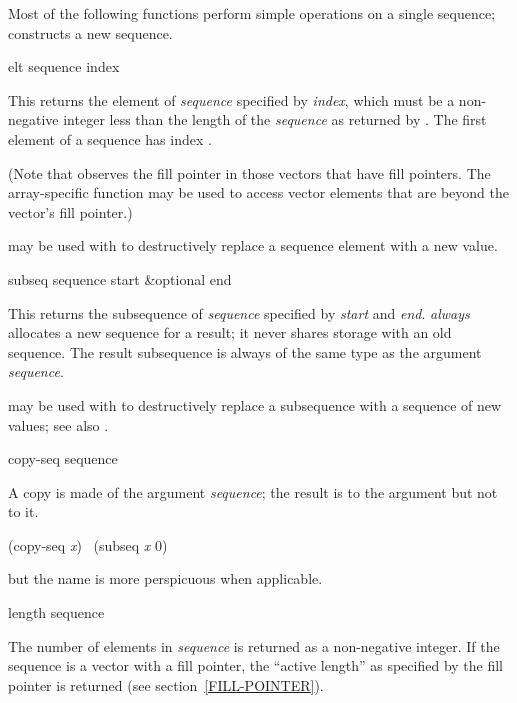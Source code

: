 Most of the following functions perform simple operations on a single
sequence;  constructs a new sequence.

\begin{defun}[Function]
elt sequence index

This returns the element of {\it sequence} specified by {\it index},
which must be a non-negative integer less than the length of the {\it sequence}
as returned by .
The first element of a sequence has index .

(Note that  observes the fill pointer in those vectors that have
fill pointers.  The array-specific function  may be used
to access vector elements that are beyond the vector's fill pointer.)

 may be used with  to destructively replace
a sequence element with a new value.
\end{defun}

\begin{defun}[Function]
subseq sequence start &optional end

This returns the subsequence of {\it sequence} specified by {\it start} and
{\it end}.
 {\it always} allocates a new sequence for a result; it never
shares storage with an old sequence.  The result subsequence is always of
the same type as the argument {\it sequence}.

 may be used with  to destructively replace
a subsequence with a sequence of new values; see also .
\end{defun}

\begin{defun}[Function]
copy-seq sequence

A copy is made of the argument {\it sequence}; the result is 
to the argument but not  to it.
\begin{lisp}
(copy-seq {\it x}) \EQ\ (subseq {\it x} 0)
\end{lisp}
but the name  is more perspicuous when applicable.
\end{defun}

\begin{defun}[Function]
length sequence

The number of elements in {\it sequence} is returned as a non-negative integer.
If the sequence is a vector with a fill pointer,
the ``active length'' as specified by the fill pointer is returned
(see section~\ref{FILL-POINTER}).
\end{defun}

